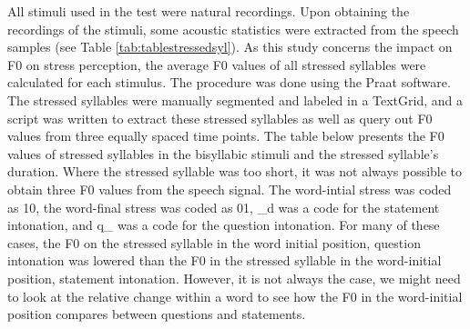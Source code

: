 \documentclass[a4paper]{article}
\begin{document}
All stimuli used in the test were natural recordings. Upon obtaining the recordings of the stimuli, some acoustic statistics were extracted from the speech samples (see Table \ref{tab:tablestressedsyl}). As this study concerns the impact on F0 on stress perception, the average F0 values of all stressed syllables were calculated for each stimulus. The procedure was done using the Praat software. The stressed syllables were manually segmented and labeled in a TextGrid, and a script was written to extract these stressed syllables as well as query out F0 values from three equally spaced time points. The table below presents the F0 values of stressed syllables in the bisyllabic stimuli and the stressed syllable's duration. Where the stressed syllable was too short, it was not always possible to obtain three F0 values from the speech signal. The word-intial stress was coded as 10, the word-final stress was coded as 01, _d was a code for the statement intonation, and q_ was a code for the question intonation. For many of these cases, the F0 on the stressed syllable in the word initial position, question intonation was lowered than the F0 in the stressed syllable in the word-initial position, statement intonation. However, it is not always the case, we might need to look at the relative change within a word to see how the F0 in the word-initial position compares between questions and statements. 
\end{document}
